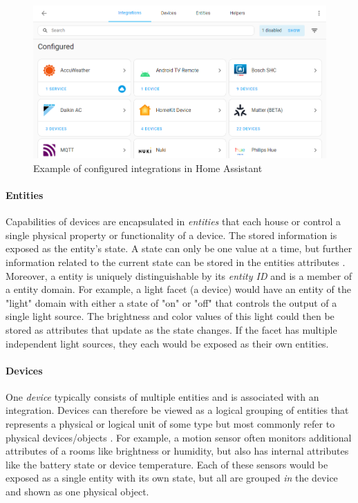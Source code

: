 \begin{figure}[H]
    \centering
    \includegraphics[width=.95\linewidth]{img/ha-integrations-configured.png}
    \caption{Example of configured integrations in Home Assistant}
    \label{fig:HA-Integrations-Configured}
\end{figure}

\paragraph{Entities}
Capabilities of devices are encapsulated in \textit{entities} that each house or control a single physical property or functionality of a device. The stored information is exposed as the entity's state. A state can only be one value at a time, but further information related to the current state can be stored in the entities attributes \cite{HomeAssistant_Docs_Concepts}. Moreover, a entity is uniquely distinguishable by its \textit{entity ID} and is a member of a entity domain. For example, a light facet (a device) would have an entity of the "light" domain with either a state of "on" or "off" that controls the output of a single light source. The brightness and color values of this light could then be stored as attributes that update as the state changes. If the facet has multiple independent light sources, they each would be exposed as their own entities.

\paragraph{Devices}
One \textit{device} typically consists of multiple entities and is associated with an integration. Devices can therefore be viewed as a logical grouping of entities that represents a physical or logical unit of some type but most commonly refer to physical devices/objects \cite{HomeAssistant_Docs_Concepts}. For example, a motion sensor often monitors additional attributes of a rooms like brightness or humidity, but also has internal attributes like the battery state or device temperature. Each of these sensors would be exposed as a single entity with its own state, but all are grouped \textit{in} the device and shown as one physical object.

